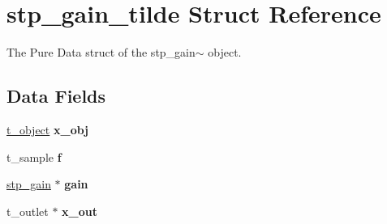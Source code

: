 \hypertarget{structstp__gain__tilde}{}\section{stp\+\_\+gain\+\_\+tilde Struct Reference}
\label{structstp__gain__tilde}


The Pure Data struct of the stp\+\_\+gain$\sim$ object. ~\newline
  


\subsection*{Data Fields}
\begin{DoxyCompactItemize}
\item 
\mbox{\label{structstp__gain__tilde_aec9b618f42517cd6740f1d37dba87d0a}} 
\hyperlink{struct__text}{t\+\_\+object} {\bfseries x\+\_\+obj}
\item 
\mbox{\label{structstp__gain__tilde_a3b27de018058e7941a2f36d7a28c2cda}} 
t\+\_\+sample {\bfseries f}
\item 
\mbox{\label{structstp__gain__tilde_a1d5e326cc46d7e26d058daf85c5d9cb5}} 
\hyperlink{structstp__gain}{stp\+\_\+gain} $\ast$ {\bfseries gain}
\item 
\mbox{\label{structstp__gain__tilde_a355caa0c783dd907f180108bc18121fa}} 
t\+\_\+outlet $\ast$ {\bfseries x\+\_\+out}
\end{DoxyCompactItemize}
